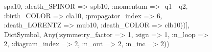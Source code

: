 \documentclass{revtex4}
\begin{document}
\begin{figure}[!htb]
\begin{center}
{spa10, :death_SPINOR => spb10, :momentum => -q1 - q2, :birth_COLOR => cla10, :propagator_index => 6, :death_LORENTZ => mub10, :death_COLOR => clb10))], Dict{Symbol, Any}(:symmetry_factor => 1, :sign => 1, :n_loop => 2, :diagram_index => 2, :n_out => 2, :n_inc => 2)) 
}
\end{center}
\end{figure}
\end{document}
